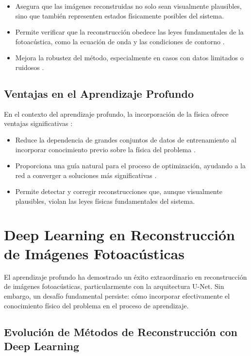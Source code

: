 \begin{itemize}
    \item Asegura que las imágenes reconstruidas no solo sean visualmente plausibles, sino que también representen estados físicamente posibles del sistema.
    \item Permite verificar que la reconstrucción obedece las leyes fundamentales de la fotoacústica, como la ecuación de onda y las condiciones de contorno \cite{tick2016image}.
    \item Mejora la robustez del método, especialmente en casos con datos limitados o ruidosos \cite{hauptmann2020deep}.
\end{itemize}

\subsection{Ventajas en el Aprendizaje Profundo}
En el contexto del aprendizaje profundo, la incorporación de la física ofrece ventajas significativas \cite{raissi2019physics}:

\begin{itemize}
    \item Reduce la dependencia de grandes conjuntos de datos de entrenamiento al incorporar conocimiento previo sobre la física del problema \cite{hoffer2019augmented}.
    \item Proporciona una guía natural para el proceso de optimización, ayudando a la red a converger a soluciones más significativas \cite{zhou2020physics}.
    \item Permite detectar y corregir reconstrucciones que, aunque visualmente plausibles, violan las leyes físicas fundamentales del sistema.
\end{itemize}


\section{Deep Learning en Reconstrucción de Imágenes Fotoacústicas}

El aprendizaje profundo ha demostrado un éxito extraordinario en reconstrucción de imágenes fotoacústicas, particularmente con la arquitectura U-Net. Sin embargo, un desafío fundamental persiste: cómo incorporar efectivamente el conocimiento físico del problema en el proceso de aprendizaje.

\subsection{Evolución de Métodos de Reconstrucción con Deep Learning}

